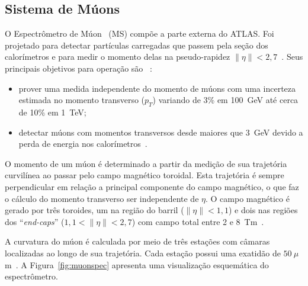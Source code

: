 \subsection{Sistema de Múons}

O Espectrômetro de Múon ~(MS) compõe a parte externa do ATLAS. Foi projetado
para detectar partículas carregadas que passem pela seção dos calorímetros e
para medir o momento delas na pseudo-rapidez $\|\eta\| < 2,7$~\cite{ATLAS2008}.
Seus principais objetivos para operação são ~\cite{Aad:1275998}:

\begin{itemize}
    \item prover uma medida independente do momento de múons com uma incerteza
    estimada no momento transverso ($p_T$) variando de 3\% em 100~GeV até cerca
    de 10\% em 1~TeV; 
    \item detectar múons com momentos transversos desde maiores que 3~GeV
    devido a perda de energia nos calorímetros~\cite{ATLAS2008}.
\end{itemize}

O momento de um  múon é determinado a partir da medição de sua trajetória
curvilínea ao passar pelo campo magnético toroidal. Esta trajetória é sempre
perpendicular em relação a principal componente do campo magnético,  o que faz
o cálculo do momento transverso ser independente de $\eta$. O campo magnético é
gerado por três toroides, um na região do barril ($\|\eta\| < 1,1$) e dois nas
regiões dos ``\emph{end-caps}'' ($1,1 < \|\eta\| < 2,7$) com campo total entre 2
e 8~Tm~\cite{Aad:1275998}.

A curvatura do múon é calculada por meio de três estações com câmaras
localizadas ao longo de sua trajetória. Cada estação possui uma exatidão de
$50~\mu$m~\cite{MUONTDR1997}. A Figura~\ref{fig:muonspec} apresenta uma
visualização esquemática do espectrômetro.



